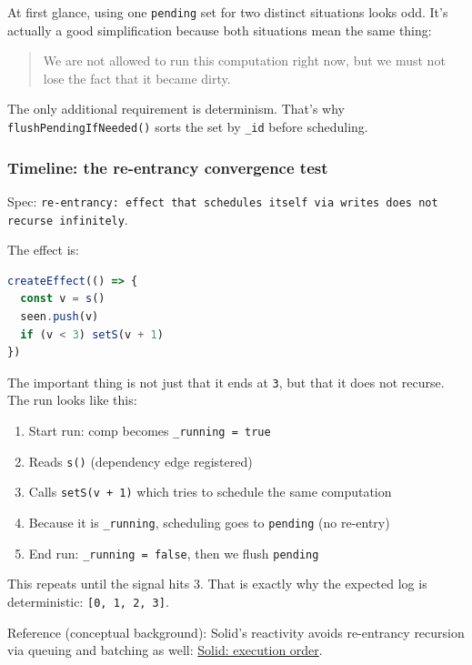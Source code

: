 At first glance, using one \texttt{pending} set for two distinct situations looks odd.
It's actually a good simplification because both situations mean the same thing:

\begin{quote}
We are not allowed to run this computation right now, but we must not lose the fact that it became dirty.
\end{quote}

The only additional requirement is determinism.
That's why \texttt{flushPendingIfNeeded()} sorts the set by \texttt{\_id} before scheduling.

\subsubsection{Timeline: the re-entrancy convergence test}

Spec: \texttt{re-entrancy: effect that schedules itself via writes does not recurse infinitely}.

The effect is:

\begin{lstlisting}[language=JavaScript]
createEffect(() => {
  const v = s()
  seen.push(v)
  if (v < 3) setS(v + 1)
})
\end{lstlisting}

The important thing is not just that it ends at \texttt{3}, but that it does not recurse.
The run looks like this:

\begin{enumerate}
  \item Start run: comp becomes \texttt{\_running = true}
  \item Reads \texttt{s()} (dependency edge registered)
  \item Calls \texttt{setS(v + 1)} which tries to schedule the same computation
  \item Because it is \texttt{\_running}, scheduling goes to \texttt{pending} (no re-entry)
  \item End run: \texttt{\_running = false}, then we flush \texttt{pending}
\end{enumerate}

This repeats until the signal hits 3.
That is exactly why the expected log is deterministic: \texttt{[0, 1, 2, 3]}.

Reference (conceptual background): Solid's reactivity avoids re-entrancy recursion via queuing and batching as well:
\href{https://www.solidjs.com/docs/latest#execution-order}{Solid: execution order}.

